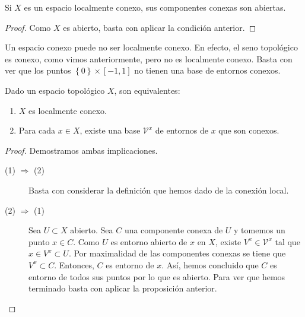 \begin{colorary}
Si $\displaystyle X $ es un espacio localmente conexo, sus componentes conexas son abiertas.
\end{colorary}
\begin{proof}
Como $\displaystyle X $ es abierto, basta con aplicar la condición anterior.
\end{proof}

\begin{eg}
	Un espacio conexo puede no ser localmente conexo. En efecto, el seno topológico es conexo, como vimos anteriormente, pero no es localmente conexo. Basta con ver que los puntos $\displaystyle \left\{ 0\right\} \times \left[-1,1\right]  $ no tienen una base de entornos conexos.
\end{eg}
\begin{prop}
Dado un espacio topológico $\displaystyle X $, son equivalentes:
\begin{enumerate}
\item $\displaystyle X $ es localmente conexo.
\item Para cada $\displaystyle x \in X $, existe una base $\displaystyle \mathcal{V}^{x} $ de entornos de $\displaystyle x $ que son conexos.
\end{enumerate}
\end{prop}
\begin{proof}
Demostramos ambas implicaciones.
\begin{description}
\item[(1) $\displaystyle \Rightarrow $ (2)] Basta con considerar la definición que hemos dado de la conexión local.
\item[(2) $\displaystyle \Rightarrow $ (1)] Sea $\displaystyle U\subset X $ abierto. Sea $\displaystyle C $ una componente conexa de $\displaystyle U $ y tomemos un punto $\displaystyle x \in C $. Como $\displaystyle U $ es entorno abierto de $\displaystyle x $ en $\displaystyle X $, existe $\displaystyle V^{x}\in \mathcal{V}^{x} $ tal que $\displaystyle x \in V^{x}\subset U $. Por maximalidad de las componentes conexas se tiene que $\displaystyle V^{x}\subset C $. Entonces, $\displaystyle C $ es entorno de $\displaystyle x $. Así, hemos concluido que $\displaystyle C $ es entorno de todos sus puntos por lo que es abierto. Para ver que hemos terminado basta con aplicar la proposición anterior.
\end{description}
\end{proof}
